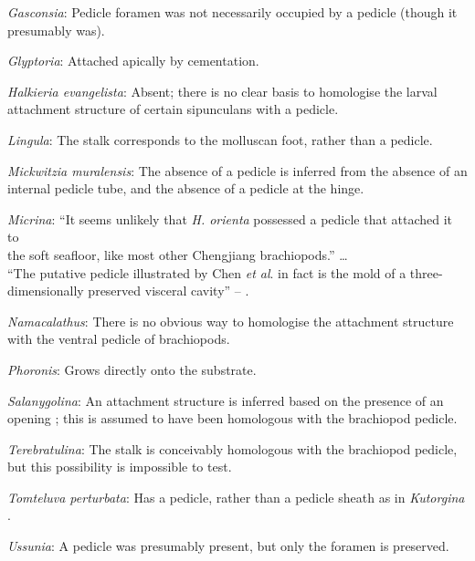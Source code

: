 \documentclass[openany]{book}
\theoremstyle{definition}
\theoremstyle{definition}
\theoremstyle{definition}
\theoremstyle{remark}
\begin{document}
\hypertarget{Gasconsia-coding-21}{}
\emph{Gasconsia}: Pedicle foramen was not necessarily occupied by a
pedicle (though it presumably was).

\hypertarget{Glyptoria-coding-21}{}
\emph{Glyptoria}: Attached apically by cementation.

\hypertarget{Halkieria_evangelista-coding-21}{}
\emph{Halkieria evangelista}: Absent; there is no clear basis to
homologise the larval attachment structure of certain sipunculans with a
pedicle.

\hypertarget{Lingula-coding-21}{}
\emph{Lingula}: The stalk corresponds to the molluscan foot, rather than
a pedicle.

\hypertarget{Mickwitzia_muralensis-coding-21}{}
\emph{Mickwitzia muralensis}: The absence of a pedicle is inferred from
the absence of an internal pedicle tube, and the absence of a pedicle at
the hinge.

\hypertarget{Micrina-coding-21}{}
\emph{Micrina}: ``It seems unlikely that \emph{H. orienta} possessed a
pedicle that attached it to\\
the soft seafloor, like most other Chengjiang brachiopods.'' \ldots{}\\
``The putative pedicle illustrated by Chen \emph{et al}.
\citeyearpar[Figs 4, 6, 7]{Chen2007Reinterpretationof} in fact is the
mold of a three-dimensionally preserved visceral cavity'' --
\citet{Zhang2009Architectureand}.

\hypertarget{Namacalathus-coding-21}{}
\emph{Namacalathus}: There is no obvious way to homologise the
attachment structure with the ventral pedicle of brachiopods.

\hypertarget{Phoronis-coding-21}{}
\emph{Phoronis}: Grows directly onto the substrate.

\hypertarget{Salanygolina-coding-21}{}
\emph{Salanygolina}: An attachment structure is inferred based on the
presence of an opening \citep{Balthasar2004Shellstructure}; this is
assumed to have been homologous with the brachiopod pedicle.

\hypertarget{Terebratulina-coding-21}{}
\emph{Terebratulina}: The stalk is conceivably homologous with the
brachiopod pedicle, but this possibility is impossible to test.

\hypertarget{Tomteluva_perturbata-coding-21}{}
\emph{Tomteluva perturbata}: Has a pedicle, rather than a pedicle sheath
as in \emph{Kutorgina}
\citep{Holmer2018Evolutionarysignificance, Holmer2018Theattachment}.

\hypertarget{Ussunia-coding-21}{}
\emph{Ussunia}: A pedicle was presumably present, but only the foramen
is preserved.
\end{document}
